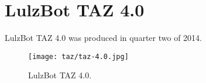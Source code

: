 %
%
%
%
%

\section{LulzBot TAZ 4.0}
LulzBot TAZ 4.0 was produced in quarter two of 2014.

\begin{figure}[h!]
\texttt{[image: taz/taz-4.0.jpg]}
 \caption{LulzBot TAZ 4.0.}
 \label{fig:taz-4.0}
\end{figure}

